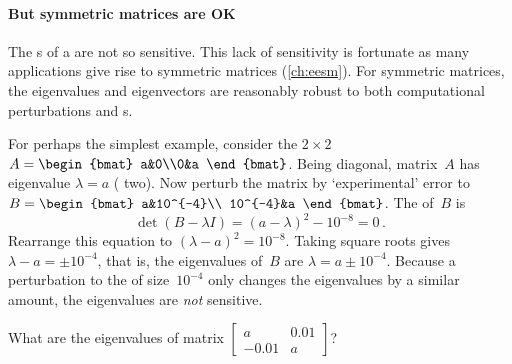 
\paragraph{But symmetric matrices are OK}
The s of a  are not so sensitive.
This lack of sensitivity is fortunate as many applications give rise to symmetric matrices (\autoref{ch:eesm}).
For symmetric matrices, the eigenvalues and eigenvectors are reasonably robust to both computational perturbations and s.




\begin{example} 
For perhaps the simplest example, consider the \(2\times2\)  \(A=\begin{bmat} a&0\\0&a \end{bmat}\).
Being diagonal, matrix~\(A\) has eigenvalue \(\lambda=a\) ( two).
Now perturb the matrix by `experimental' error to \(B=\begin{bmat} a&10^{-4}\\ 10^{-4}&a \end{bmat}\).
The  of~\(B\) is
\begin{equation*}
\det(B-\lambda I)=(a-\lambda)^2-10^{-8}=0\,.
\end{equation*}
Rearrange this equation to \((\lambda-a)^2=10^{-8}\).  
Taking square roots gives \(\lambda-a=\pm 10^{-4}\), that is, the eigenvalues of~\(B\) are \(\lambda=a\pm10^{-4}\).
Because a perturbation to the  of size~\(10^{-4}\) only changes the eigenvalues by a similar amount, the eigenvalues are \emph{not} sensitive.
\end{example}





\begin{activity}
What are the eigenvalues of matrix \(\begin{bmatrix} a&0.01\\-0.01&a \end{bmatrix}\)?
\end{activity}





